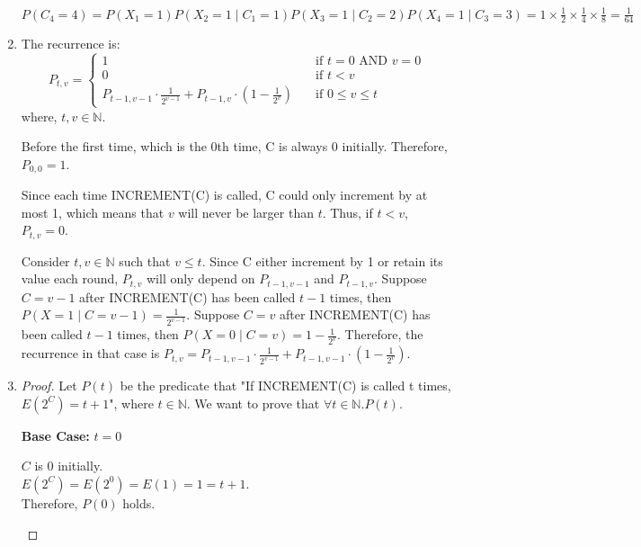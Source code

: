 \documentclass[10pt]{article}
\newcommand{\aand}{\mbox{ AND }}
\begin{document}
\begin{enumerate}
		$P(C_4=4) = P(X_1 = 1)P(X_2=1 \mid C_1=1)P(X_3=1 \mid C_2=2)P(X_4=1
		\mid C_3=3) = 1 \times \frac{1}{2} \times \frac{1}{4} \times
		\frac{1}{8} = \frac{1}{64}$
	

\begin{comment}
2. Write a recurrence that describes the probablity $P_{t, v}$ that C = v after
INCREMENT(C) has been called t times, Explain your answer.
\end{comment}
	\item
		The recurrence is:
		\[ P_{t,v} = 
		\begin{cases}
			1 & \quad \text{if } t = 0 \aand v = 0 \\
			0 & \quad \text{if } t < v \\
			P_{t-1, v-1} \cdot \frac{1}{2^{v-1}} + P_{t-1,v} \cdot
			\left(1-\frac{1}{2^v} \right) & \quad \text{if } 0 \leq v \leq t
		\end{cases}
		\]
		where, $t, v \in \mathbb{N}$. 

		Before the first time, which is the 0th time, C is always 0 initially.
		Therefore, $P_{0,0} = 1$. 

		Since each time INCREMENT(C) is called, C could only increment by at
		most 1, which means that $v$ will never be larger than $t$. Thus, if $t
		< v$, $P_{t, v} = 0$. 

		Consider $t,v \in \mathbb{N}$ such that $v \leq t$. Since C either
		increment by 1 or retain its value each round, $P_{t,v}$ will only
		depend on $P_{t-1,v-1}$ and $P_{t-1, v}$. Suppose $C=v-1$ after
		INCREMENT(C) has been called $t-1$ times, then $P(X=1 \mid C=v-1) =
		\frac{1}{2^{v-1}}$. Suppose $C=v$ after INCREMENT(C) has been called
		$t-1$ times, then $P(X=0 \mid C=v) = 1-\frac{1}{2^v}$. Therefore, the
		recurrence in that case is $P_{t,v} = P_{t-1,v-1} \cdot
		\frac{1}{2^{v-1}} + P_{t-1,v-1} \cdot \left(1-\frac{1}{2^{v}} \right)$.

\begin{comment}
3. Prove that if INCREMENT(C) is called t times, then the expected value of
$2^C$ is t+1
\end{comment}
	\item
		\begin{proof}
			Let $P(t)$ be the predicate that "If INCREMENT(C) is called t
			times,  $E(2^C) = t+1$", where $t \in \mathbb{N}$. We want to prove
			that $\forall t \in \mathbb{N}. P(t)$. 

			\textbf{Base Case:} $t=0$
			\begin{addmargin}[1em]{0em}
				$C$ is 0 initially. \\
				$E(2^C) = E(2^0) = E(1) = 1 = t+1$. \\
				Therefore, $P(0)$ holds.
			\end{addmargin}


\end{proof}
\end{enumerate}
\end{document}

